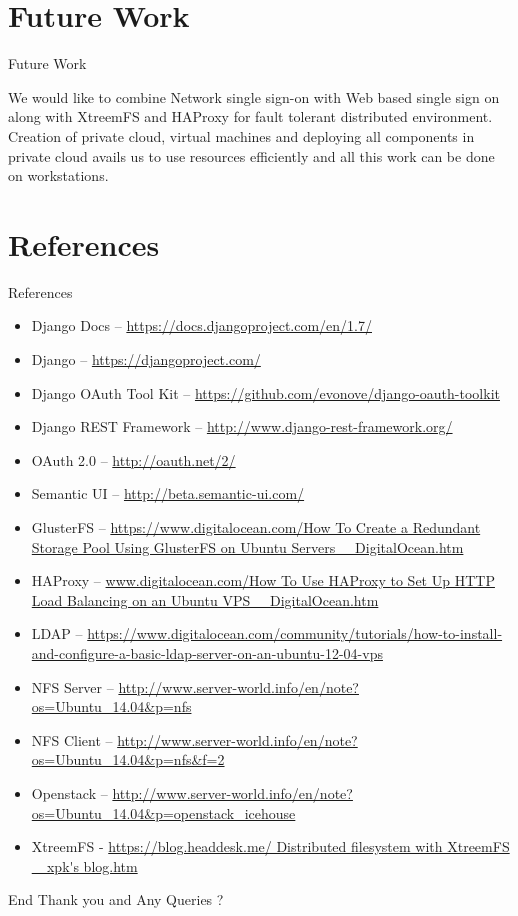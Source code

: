 \documentclass[10pt,xcolor=dvipsnames]{beamer}
\begin{document}
\section{Future Work}
\begin{frame}{Future Work}

We would like to combine Network single sign-on with Web based single sign on along with XtreemFS and HAProxy for fault tolerant distributed environment. Creation of private cloud, virtual machines and deploying all components in private cloud avails us to use resources efficiently and all this work can be done on workstations.
\end{frame}

\section{References}
\begin{frame}[allowframebreaks]{References}
\small
\begin{itemize}
	\item Django Docs -- \url{https://docs.djangoproject.com/en/1.7/}
	\item Django -- \url{https://djangoproject.com/}
	\item Django OAuth Tool Kit -- \url{https://github.com/evonove/django-oauth-toolkit}
	\item Django REST Framework -- \url{http://www.django-rest-framework.org/}
	\item OAuth 2.0 -- \url{http://oauth.net/2/}
	\item Semantic UI -- \url{http://beta.semantic-ui.com/}
	\item GlusterFS -- \url{https://www.digitalocean.com/How To Create a Redundant Storage Pool Using GlusterFS on Ubuntu Servers _ DigitalOcean.htm}
	\item HAProxy -- \url{www.digitalocean.com/How To Use HAProxy to Set Up HTTP Load Balancing on an Ubuntu VPS _ DigitalOcean.htm}
	\item LDAP -- \url{https://www.digitalocean.com/community/tutorials/how-to-install-and-configure-a-basic-ldap-server-on-an-ubuntu-12-04-vps}
	\item NFS Server -- \url{http://www.server-world.info/en/note?os=Ubuntu_14.04&p=nfs}
	\item NFS Client -- \url{http://www.server-world.info/en/note?os=Ubuntu_14.04&p=nfs&f=2}
	\item Openstack -- \url{http://www.server-world.info/en/note?os=Ubuntu_14.04&p=openstack_icehouse}
\item XtreemFS - \url{https://blog.headdesk.me/ Distributed filesystem with XtreemFS _ xpk's blog.htm}
\end{itemize}
\end{frame}



\begin{frame}{End}
Thank you and Any Queries ?
\end{frame}
\end{document}
